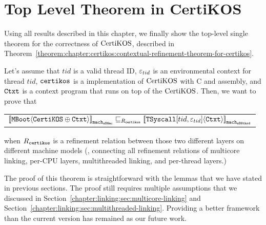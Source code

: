 \section{Top Level Theorem in CertiKOS}
\label{chapter:certikos:sec:top-level-theorem}


Using all results described in this chapter, 
we finally show the top-level single theorem for the correctness of $\mathrm{CertiKOS}$, 
described in Theorem~\ref{theorem:chapter:certikos:contextual-refinement-theorem-for-certikos}. 

\begin{theorem}
\label{theorem:chapter:certikos:contextual-refinement-theorem-for-certikos}
Let's assume that $tid$ is a valid thread ID, ${\varepsilon}_{tid}$ is an
environmental context for thread $tid$, ${\mathrm{\texttt{certikos}}}$ is a implementation of $\mathrm{CertiKOS}$ with C and assembly, and ${\mathrm{\texttt{Ctxt}}}$ is a
 context program that runs on top of the $\mathrm{CertiKOS}$. 
 Then, we want to prove that 
 \begin{center}
\begin{tabular}{c}
${[\![{{\mathrm{\texttt{MBoot}}}} \langle {{\mathrm{\texttt{CertiKOS}}} \oplus {\mathrm{\texttt{Ctxt}}}} \rangle]\!]}_{{\mathrm{\texttt{mach}}}_{{\mathrm{\texttt{x86mc}}}}} \sqsubseteq_{R_{{\mathrm{\texttt{certikos}}}}} {[\![{{\mathrm{\texttt{TSyscall}}}[tid, {\varepsilon}_{tid}]} \langle {{\mathrm{\texttt{Ctxt}}}} \rangle]\!]}_{{{\mathrm{\texttt{mach}}}_{{\mathrm{\texttt{x86thrd}}}}}}$\\
\end{tabular}
\end{center}
when $R_{{\mathrm{\texttt{certikos}}}}$ is a refinement relation between those two different layers on different machine models (\ie, connecting all refinement relations of multicore linking, per-CPU layers, multithreaded linking, and per-thread layers.)
\end{theorem}

The proof of this theorem is 
straightforward with 
the lemmas that we have stated in previous sections.
The proof still requires multiple assumptions that we discussed 
in Section~\ref{chapter:linking:sec:multicore-linking} and Section~\ref{chapter:linking:sec:multithreaded-linking}. 
Providing a better framework than the current version has remained as our future work. 

%
%

